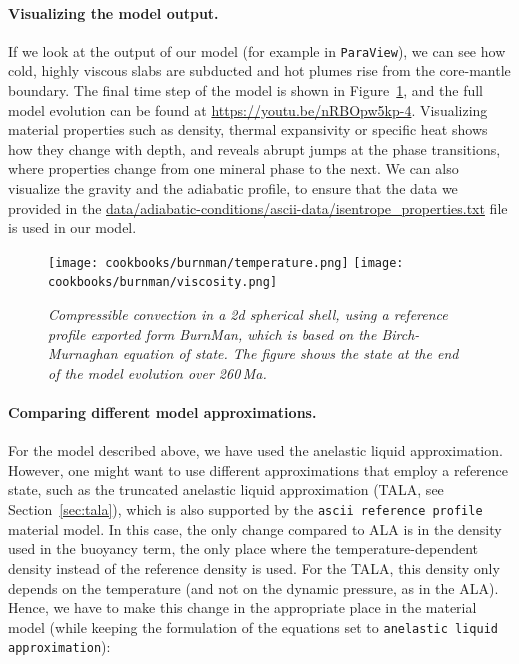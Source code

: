 \documentclass{article}
\begin{document}
\paragraph{Visualizing the model output.}
If we look at the output of our model (for example in \texttt{ParaView}), we can see how cold, highly 
viscous slabs are subducted and hot plumes rise from the core-mantle boundary. The final time step of 
the model is shown in Figure~\ref{fig:burnman-convection}, and the full model evolution can be found 
at \url{https://youtu.be/nRBOpw5kp-4}.
Visualizing material properties such as density, thermal expansivity or specific heat shows how they
change with depth, and reveals abrupt jumps at the phase transitions, where properties change from one
mineral phase to the next. We can also visualize the gravity and the adiabatic profile, to ensure that
the data we provided in the \url{data/adiabatic-conditions/ascii-data/isentrope_properties.txt} file
is used in our model. 

\begin{figure}
  \texttt{[image: cookbooks/burnman/temperature.png]}
  \hfill
  \texttt{[image: cookbooks/burnman/viscosity.png]}
  \caption{\it Compressible convection in a 2d spherical shell, using a reference profile exported 
               form BurnMan, which is based on the Birch-Murnaghan equation of state. The figure shows the
               state at the end of the model evolution over 260\,Ma.}
  \label{fig:burnman-convection}
\end{figure}

\paragraph{Comparing different model approximations.}
For the model described above, we have used the anelastic liquid approximation. However, one might want 
to use different approximations that employ a reference state, such as the truncated anelastic liquid 
approximation (TALA, see Section~\ref{sec:tala}), which is also supported by the 
\texttt{ascii reference profile} material model. In this case, the only change compared to ALA 
is in the density used in the buoyancy term, the only place where the temperature-dependent density
instead of the reference density is used. For the TALA, this density only depends on the temperature 
(and not on the dynamic pressure, as in the ALA). Hence, we have to make this change in the appropriate 
place in the material model (while keeping the formulation of the equations set to 
\texttt{anelastic liquid approximation}):

\end{document}
